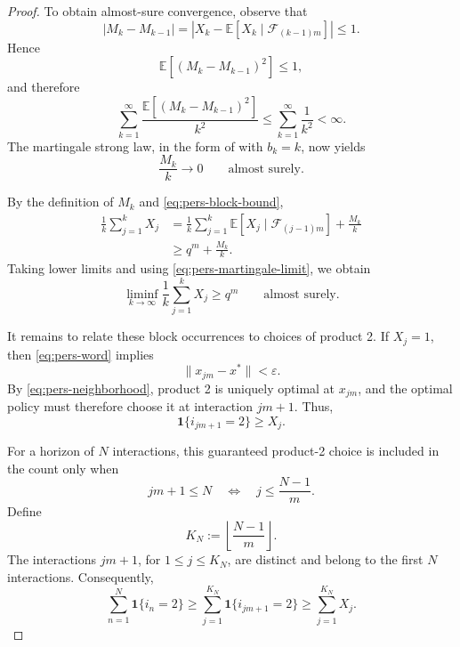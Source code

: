 \documentclass[11pt]{article}
\begin{document}
\begin{proof}
To obtain almost-sure convergence, observe that
\begin{equation*}
|M_k-M_{k-1}|
=
\left|
X_k-\mathbb E[X_k\mid\mathcal F_{(k-1)m}]
\right|
\le1.
\end{equation*}
Hence
\begin{equation*}
\mathbb E[(M_k-M_{k-1})^2]\le1,
\end{equation*}
and therefore
\begin{equation*}
\sum_{k=1}^{\infty}
\frac{\mathbb E[(M_k-M_{k-1})^2]}{k^2}
\le
\sum_{k=1}^{\infty}\frac{1}{k^2}
<\infty.
\end{equation*}
The martingale strong law, in the form of
\cite[Exercise~4.4.11]{Durrett2019} with $b_k=k$,
now yields
\begin{equation}
\label{eq:pers-martingale-limit}
\frac{M_k}{k}\longrightarrow0
\qquad\text{almost surely}.
\end{equation}

By the definition of $M_k$ and \eqref{eq:pers-block-bound},
\begin{equation*}
\begin{aligned}
\frac{1}{k}\sum_{j=1}^{k}X_j
&=
\frac{1}{k}\sum_{j=1}^{k}
\mathbb E[X_j\mid\mathcal F_{(j-1)m}]
+\frac{M_k}{k}\\
&\ge q^m+\frac{M_k}{k}.
\end{aligned}
\end{equation*}
Taking lower limits and using
\eqref{eq:pers-martingale-limit}, we obtain
\begin{equation}
\label{eq:pers-block-frequency}
\liminf_{k\to\infty}
\frac{1}{k}\sum_{j=1}^{k}X_j
\ge q^m
\qquad\text{almost surely}.
\end{equation}

It remains to relate these block occurrences to choices of product 2.
If $X_j=1$, then \eqref{eq:pers-word} implies
\begin{equation*}
\|x_{jm}-x^*\|<\varepsilon.
\end{equation*}
By \eqref{eq:pers-neighborhood}, product 2 is uniquely optimal
at $x_{jm}$, and the optimal policy must therefore choose it
at interaction $jm+1$.
Thus,
\begin{equation*}
\mathbf 1\{i_{jm+1}=2\}\ge X_j.
\end{equation*}

For a horizon of $N$ interactions, this guaranteed product-2
choice is included in the count only when
\begin{equation*}
jm+1\le N
\quad\Longleftrightarrow\quad
j\le\frac{N-1}{m}.
\end{equation*}
Define
\begin{equation*}
K_N:=\left\lfloor\frac{N-1}{m}\right\rfloor.
\end{equation*}
The interactions $jm+1$, for $1\le j\le K_N$, are distinct
and belong to the first $N$ interactions.
Consequently,
\begin{equation*}
\sum_{n=1}^{N}\mathbf 1\{i_n=2\}
\ge
\sum_{j=1}^{K_N}\mathbf 1\{i_{jm+1}=2\}
\ge
\sum_{j=1}^{K_N}X_j.
\end{equation*}


\end{proof}
\end{document}

